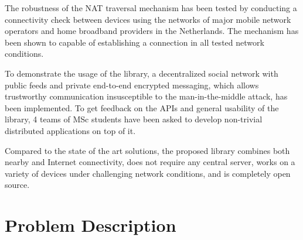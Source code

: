 



The robustness of the NAT traversal mechanism has been tested by conducting a connectivity check between devices using the networks of major mobile network operators and home broadband providers in the Netherlands. The mechanism has been shown to capable of establishing a connection in all tested network conditions.

To demonstrate the usage of the library, a decentralized social network with public feeds and private end-to-end encrypted messaging, which allows trustworthy communication insusceptible to the man-in-the-middle attack, has been implemented. To get feedback on the APIs and general usability of the library, 4 teams of MSc students have been asked to develop non-trivial distributed applications on top of it.

Compared to the state of the art solutions, the proposed library combines both nearby and Internet connectivity, does not require any central server, works on a variety of devices under challenging network conditions, and is completely open source.

\chapter{Problem Description}

